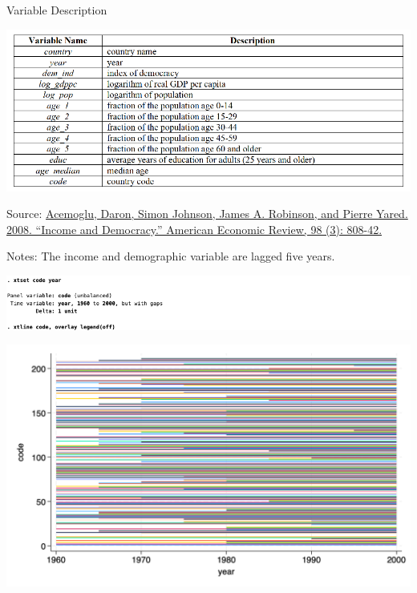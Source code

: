 \documentclass[
  10pt,
  ignorenonframetext,
]{beamer}
\begin{document}
\begin{frame}{Variable Description}
\protect\hypertarget{variable-description-1}{}
\begin{center}\includegraphics[width=1\linewidth]{pictures/Ex2-VarDef} \end{center}
\footnotesize

Source:
\href{https://www.aeaweb.org/articles?id=10.1257/aer.98.3.808}{Acemoglu,
Daron, Simon Johnson, James A. Robinson, and Pierre Yared. 2008.
``Income and Democracy.'' American Economic Review, 98 (3): 808-42.}

Notes: The income and demographic variable are lagged five years.
\end{frame}

\begin{frame}{}
\protect\hypertarget{section-1}{}
\begin{center}\includegraphics[width=1\linewidth]{pictures/Ex2-xtset-xtline} \end{center}

\begin{center}\includegraphics[width=1\linewidth]{pictures/Q2-panelView} \end{center}
\end{frame}
\end{document}
